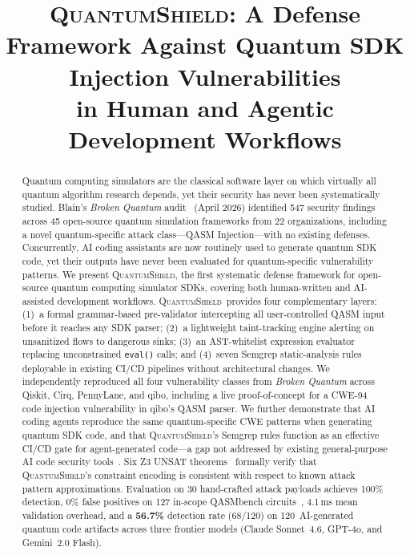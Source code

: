 \documentclass[conference,compsoc]{IEEEtran}
\newcommand{\tool}{\textsc{QuantumShield}}
\begin{document}
\title{\tool: A Defense Framework Against Quantum SDK Injection Vulnerabilities\\
in Human and Agentic Development Workflows}

\author{%
\and
{}
}

\maketitle

\begin{abstract}
Quantum computing simulators are the classical software layer on which
virtually all quantum algorithm research depends, yet their security has
never been systematically studied.
Blain's \textit{Broken Quantum} audit~\cite{blain2026broken} (April 2026)
identified 547 security findings across 45 open-source quantum simulation
frameworks from 22 organizations, including a novel quantum-specific
attack class---QASM Injection---with no existing defenses.
Concurrently, AI coding assistants are now routinely used to generate
quantum SDK code, yet their outputs have never been evaluated for
quantum-specific vulnerability patterns.
We present \tool, the first systematic defense framework for open-source
quantum computing simulator SDKs, covering both human-written and
AI-assisted development workflows.
\tool\ provides four complementary layers:
(1)~a formal grammar-based pre-validator intercepting all user-controlled
QASM input before it reaches any SDK parser;
(2)~a lightweight taint-tracking engine alerting on unsanitized flows to
dangerous sinks;
(3)~an AST-whitelist expression evaluator replacing unconstrained
\texttt{eval()} calls; and
(4)~seven Semgrep static-analysis rules deployable in existing CI/CD
pipelines without architectural changes.
We independently reproduced all four vulnerability classes from
\textit{Broken Quantum} across Qiskit, Cirq, PennyLane, and qibo,
including a live proof-of-concept for a CWE-94 code injection
vulnerability in qibo's QASM parser.
We further demonstrate that AI coding agents reproduce the same
quantum-specific CWE patterns when generating quantum SDK code, and
that \tool's Semgrep rules function as an effective CI/CD gate for
agent-generated code---a gap not addressed by existing general-purpose
AI code security tools~\cite{bbd2026,vibeguard2026}.
Six Z3 UNSAT theorems~\cite{demoura2008z3} formally verify that \tool's
constraint encoding is consistent with respect to known attack pattern
approximations.
Evaluation on 30 hand-crafted attack payloads achieves 100\% detection,
0\% false positives on 127 in-scope QASMbench circuits~\cite{li2022qasmbench},
4.1\,ms mean validation overhead, and a \textbf{56.7\%} detection rate (68/120) on
120~AI-generated quantum code artifacts across three frontier models
(Claude Sonnet~4.6, GPT-4o, and Gemini~2.0 Flash).
\end{abstract}
\end{document}
